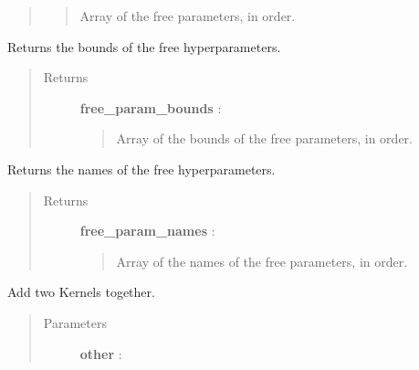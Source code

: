 \documentclass[letterpaper,10pt,english]{sphinxmanual}
\begin{document}
\begin{fulllineitems}
\begin{fulllineitems}
\begin{quote}
\begin{description}
\begin{quote}
Array of the free parameters, in order.
\end{quote}

\end{description}\end{quote}

\end{fulllineitems}


\begin{fulllineitems}
\label{gptools.kernel:gptools.kernel.core.Kernel.free_param_bounds}
Returns the bounds of the free hyperparameters.
\begin{quote}\begin{description}
\item[{Returns}] \leavevmode
\textbf{free\_param\_bounds} : 
\begin{quote}

Array of the bounds of the free parameters, in order.
\end{quote}

\end{description}\end{quote}

\end{fulllineitems}


\begin{fulllineitems}
\label{gptools.kernel:gptools.kernel.core.Kernel.free_param_names}
Returns the names of the free hyperparameters.
\begin{quote}\begin{description}
\item[{Returns}] \leavevmode
\textbf{free\_param\_names} : 
\begin{quote}

Array of the names of the free parameters, in order.
\end{quote}

\end{description}\end{quote}

\end{fulllineitems}


\begin{fulllineitems}
\label{gptools.kernel:gptools.kernel.core.Kernel.__add__}
Add two Kernels together.
\begin{quote}\begin{description}
\item[{Parameters}] \leavevmode
\textbf{other} : {\hyperref[gptools.kernel:gptools.kernel.core.Kernel]{}}
\begin{quote}


\end{quote}
\end{description}
\end{quote}
\end{fulllineitems}
\end{fulllineitems}
\end{document}
